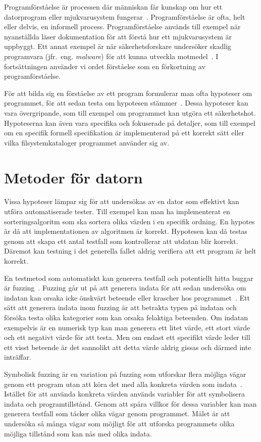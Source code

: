 Programförståelse är processen där människan får kunskap om hur ett datorprogram
eller mjukvarusystem fungerar~\cite{xia2018}. Programförståelse är ofta, helt
eller delvis, en informell process. Programförståelse används till exempel när
nyanställda läser dokumentation för att förstå hur ett mjukvarusystem är
uppbyggt. Ett annat exempel är när säkerhetsforskare undersöker skadlig
programvara (jfr.\ eng. \emph{malware}) för att kunna utveckla
motmedel~\cite{andriesse2018}. I fortsättningen använder vi ordet förståelse som
en förkortning av programförståelse.

För att bilda sig en förståelse av ett program formulerar man ofta hypoteser om
programmet, för att sedan testa om hypotesen stämmer~\cite{hermans2021}. Dessa
hypoteser kan vara övergripande, som till exempel om programmet kan utgöra ett
säkerhetshot.  Hypoteserna kan även vara specifika och fokuserade på detaljer,
som till exempel om en specifik formell specifikation är implementerad på ett
korrekt sätt eller vilka filsystemkataloger programmet använder sig av.

\section{Metoder för datorn}

Vissa hypoteser lämpar sig för att undersökas av en dator som effektivt kan
utföra automatiserade tester. Till exempel kan man ha implementerat en
sorteringsalgoritm som ska sortera olika värden i en specifik ordning. En
hypotes är då att implementationen av algoritmen är korrekt. Hypotesen kan då
testas genom att skapa ett antal testfall som kontrollerar att utdatan blir
korrekt. Däremot kan testning i det generella fallet aldrig verifiera att ett
program är helt korrekt.

En testmetod som automatiskt kan generera testfall och potentiellt hitta buggar
är fuzzing~\cite{macel2021}. Fuzzing går ut på att generera indata för att sedan
undersöka om indatan kan orsaka icke önskvärt beteende eller krascher hos
programmet~\cite{macel2021}. Ett sätt att generera indata inom fuzzing är att
betrakta typen på indatan och försöka testa olika kategorier som kan orsaka
felaktiga beteenden. Om indatan exempelvis är en numerisk typ kan man generera
ett litet värde, ett stort värde och ett negativt värde för att testa. Men om
endast ett specifikt värde leder till ett visst beteende är det sannolikt att
detta värde aldrig gissas och därmed inte inträffar.

Symbolisk fuzzing är en variation på fuzzing som utforskar flera möjliga vägar
genom ett program utan att köra det med alla konkreta värden som
indata~\cite{fuzzingbook2023:SymbolicFuzzer}.  Istället för att använda konkreta
värden används variabler för att symbolisera indata och programtillstånd. Genom
att spåra villkor för dessa variabler kan man generera testfall som täcker olika
vägar genom programmet. Målet är att undersöka så många vägar som möjligt för
att utforska programmets olika möjliga tillstånd som kan nås med olika indata.

